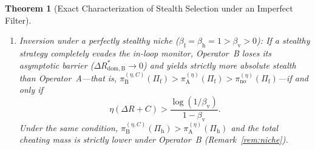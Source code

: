 \documentclass[11pt,a4paper]{article}
\newtheorem{theorem}{Theorem}
\begin{document}
\begin{theorem}[Exact Characterization of Stealth Selection under an Imperfect Filter]
\begin{enumerate}
\begin{enumerate}
\begin{equation}
      \xrightarrow[\eta \to +\infty]{} \frac{\beta_{\mathrm{h}} - \beta_{\mathrm{f}}}{\beta_{\mathrm{f}}}\,C > 0 \quad (C > 0).
    \end{equation}
    \item \emph{Inversion under a perfectly stealthy niche ($\beta_{\mathrm{f}} = \beta_{\mathrm{h}} = 1 > \beta_{\mathrm{v}} > 0$):} If a stealthy strategy completely evades the in-loop monitor, Operator~B loses its asymptotic barrier ($\Delta R_{\mathrm{dom, B}}^* \to 0$) and yields strictly more absolute stealth than Operator~A---that is, $\pi_{\mathrm{B}}^{(\eta, C)}(\Pi_{\mathrm{f}}) > \pi_{\mathrm{A}}^{(\eta)}(\Pi_{\mathrm{f}}) > \pi_{\mathrm{no}}^{(\eta)}(\Pi_{\mathrm{f}})$---if and only if
    \begin{equation}\label{eq:inversion}
      \eta(\Delta R + C) > \frac{\log(1/\beta_{\mathrm{v}})}{1 - \beta_{\mathrm{v}}}.
    \end{equation}
    Under the same condition, $\pi_{\mathrm{B}}^{(\eta, C)}(\Pi_{\mathrm{h}}) > \pi_{\mathrm{A}}^{(\eta)}(\Pi_{\mathrm{h}})$ and the total cheating mass is strictly lower under Operator~B (Remark~\ref{rem:niche}).
  \end{enumerate}
\end{enumerate}
\end{theorem}
\end{document}
